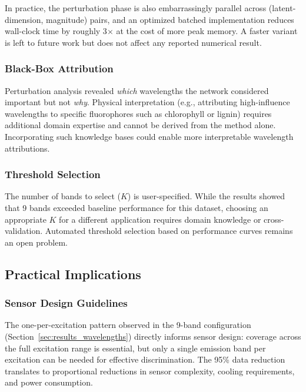 In practice, the perturbation phase is also embarrassingly parallel across (latent-dimension, magnitude) pairs, and an optimized batched implementation reduces wall-clock time by roughly 3$\times$ at the cost of more peak memory.
A faster variant is left to future work but does not affect any reported numerical result.

\subsubsection{Black-Box Attribution}
Perturbation analysis revealed \emph{which} wavelengths the network considered important but not \emph{why}.
Physical interpretation (e.g., attributing high-influence wavelengths to specific fluorophores such as chlorophyll or lignin) requires additional domain expertise \cite{meysurova2021optical} and cannot be derived from the method alone.
Incorporating such knowledge bases could enable more interpretable wavelength attributions.

\subsubsection{Threshold Selection}
The number of bands to select ($K$) is user-specified.
While the results showed that 9 bands exceeded baseline performance for this dataset, choosing an appropriate $K$ for a different application requires domain knowledge or cross-validation.
Automated threshold selection based on performance curves remains an open problem.

\subsection{Practical Implications}
\label{sec:discussion_practical}

\subsubsection{Sensor Design Guidelines}
The one-per-excitation pattern observed in the 9-band configuration (Section~\ref{sec:results_wavelengths}) directly informs sensor design: coverage across the full excitation range is essential, but only a single emission band per excitation can be needed for effective discrimination.
The 95\% data reduction translates to proportional reductions in sensor complexity, cooling requirements, and power consumption.

